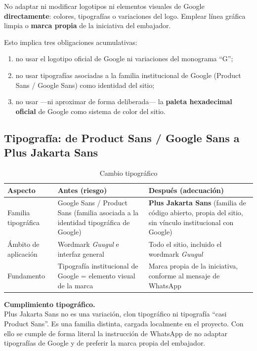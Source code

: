 \documentclass[11pt,a4paper]{article}
\begin{document}
No adaptar ni modificar logotipos ni elementos visuales de Google \textbf{directamente}: colores, tipografías o variaciones del logo. Emplear línea gráfica limpia o \textbf{marca propia} de la iniciativa del embajador.

Esto implica tres obligaciones acumulativas:

\begin{enumerate}[leftmargin=*]
  \item no usar el logotipo oficial de Google ni variaciones del monograma \enquote{G};
  \item no usar tipografías asociadas a la familia institucional de Google (Product Sans / Google Sans) como identidad del sitio;
  \item no usar ---ni aproximar de forma deliberada--- la \textbf{paleta hexadecimal oficial} de Google como sistema de color del sitio.
\end{enumerate}

\subsection{Tipografía: de Product Sans / Google Sans a Plus Jakarta Sans}

\begin{table}[h]
\centering
\caption{Cambio tipográfico}
\begin{tabular}{@{}p{3.8cm}p{5.5cm}p{5.2cm}@{}}
\toprule
\textbf{Aspecto} & \textbf{Antes (riesgo)} & \textbf{Después (adecuación)} \\
\midrule
Familia tipográfica & Google Sans / Product Sans (familia asociada a la identidad tipográfica de Google) & \textbf{Plus Jakarta Sans} (familia de código abierto, propia del sitio, sin vínculo institucional con Google) \\
\addlinespace
Ámbito de aplicación & Wordmark \emph{Guugul} e interfaz general & Todo el sitio, incluido el wordmark \emph{Guugul} \\
\addlinespace
Fundamento & Tipografía institucional de Google = elemento visual de la marca & Marca propia de la iniciativa, conforme al mensaje de WhatsApp \\
\bottomrule
\end{tabular}
\end{table}

\begin{cumplbox}
\noindent\textbf{Cumplimiento tipográfico.}\\[0.3em]
Plus Jakarta Sans no es una variación, clon tipográfico ni tipografía \enquote{casi Product Sans}. Es una familia distinta, cargada localmente en el proyecto. Con ello se cumple de forma literal la instrucción de WhatsApp de no adaptar tipografías de Google y de preferir la marca propia del embajador.
\end{cumplbox}
\end{document}
